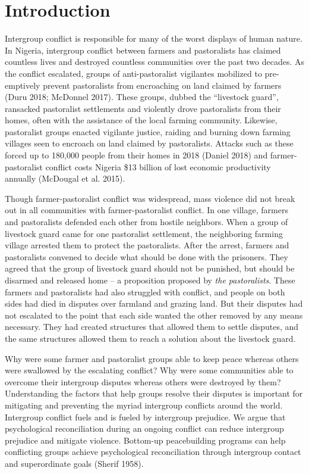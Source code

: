 \documentclass[11pt]{article}
\begin{document}
\section{Introduction}\label{introduction}

Intergroup conflict is responsible for many of the worst displays of
human nature. In Nigeria, intergroup conflict between farmers and
pastoralists has claimed countless lives and destroyed countless
communities over the past two decades. As the conflict escalated, groups
of anti-pastoralist vigilantes mobilized to pre-emptively prevent
pastoralists from encroaching on land claimed by farmers (Duru 2018;
McDonnel 2017). These groups, dubbed the ``livestock guard'', ransacked
pastoralist settlements and violently drove pastoralists from their
homes, often with the assistance of the local farming community.
Likewise, pastoralist groups enacted vigilante justice, raiding and
burning down farming villages seen to encroach on land claimed by
pastoralists. Attacks such as these forced up to 180,000 people from
their homes in 2018 (Daniel 2018) and farmer-pastoralist conflict costs
Nigeria \$13 billion of lost economic productivity annually (McDougal et
al. 2015).

Though farmer-pastoralist conflict was widespread, mass violence did not
break out in all communities with farmer-pastoralist conflict. In one
village, farmers and pastoralists defended each other from hostile
neighbors. When a group of livestock guard came for one pastoralist
settlement, the neighboring farming village arrested them to protect the
pastoralists. After the arrest, farmers and pastoralists convened to
decide what should be done with the prisoners. They agreed that the
group of livestock guard should not be punished, but should be disarmed
and released home -- a proposition proposed by \emph{the pastoralists}.
These farmers and pastoralists had also struggled with conflict, and
people on both sides had died in disputes over farmland and grazing
land. But their disputes had not escalated to the point that each side
wanted the other removed by any means necessary. They had created
structures that allowed them to settle disputes, and the same structures
allowed them to reach a solution about the livestock guard.

Why were some farmer and pastoralist groups able to keep peace whereas
others were swallowed by the escalating conflict? Why were some
communities able to overcome their intergroup disputes whereas others
were destroyed by them? Understanding the factors that help groups
resolve their disputes is important for mitigating and preventing the
myriad intergroup conflicts around the world. Intergroup conflict fuels
and is fueled by intergroup prejudice. We argue that psychological
reconciliation during an ongoing conflict can reduce intergroup
prejudice and mitigate violence. Bottom-up peacebuilding programs can
help conflicting groups achieve psychological reconciliation through
intergroup contact and superordinate goals (Sherif 1958).
\end{document}
